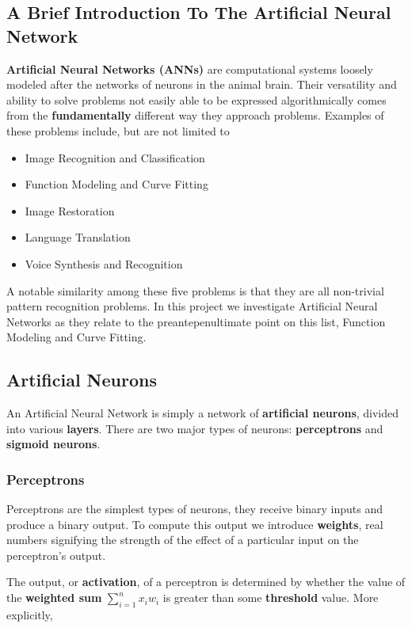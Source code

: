 \documentclass{article}
\begin{document}
\subsection{A Brief Introduction To The Artificial Neural Network}
\textbf{Artificial Neural Networks (ANNs)} are computational systems loosely modeled after the networks of neurons in the animal brain. Their versatility and ability to solve problems not easily able to be expressed algorithmically comes from the \textbf{fundamentally} different way they approach problems. Examples of these problems include, but are not limited to
\begin{itemize}
    \item Image Recognition and Classification
    \item Function Modeling and Curve Fitting
    \item Image Restoration
    \item Language Translation
    \item Voice Synthesis and Recognition
\end{itemize}

A notable similarity among these five problems is that they are all non-trivial pattern recognition problems. In this project we investigate Artificial Neural Networks as they relate to the preantepenultimate point on this list, Function Modeling and Curve Fitting.

\subsection{Artificial Neurons}
An Artificial Neural Network is simply a network of \textbf{artificial neurons}, divided into various \textbf{layers}.
There are two major types of neurons: \textbf{perceptrons} and \textbf{sigmoid neurons}.

\subsubsection{Perceptrons}
Perceptrons are the simplest types of neurons, they receive binary inputs and produce a binary output. To compute this output we introduce \textbf{weights}, real numbers signifying the strength of the effect of a particular input on the perceptron's output.


The output, or \textbf{activation}, of a perceptron is determined by whether the value of the \textbf{weighted sum} $\sum_{i=1}^{n}{x_{i}w_{i}}$ is greater than some \textbf{threshold} value. More explicitly,
\end{document}
